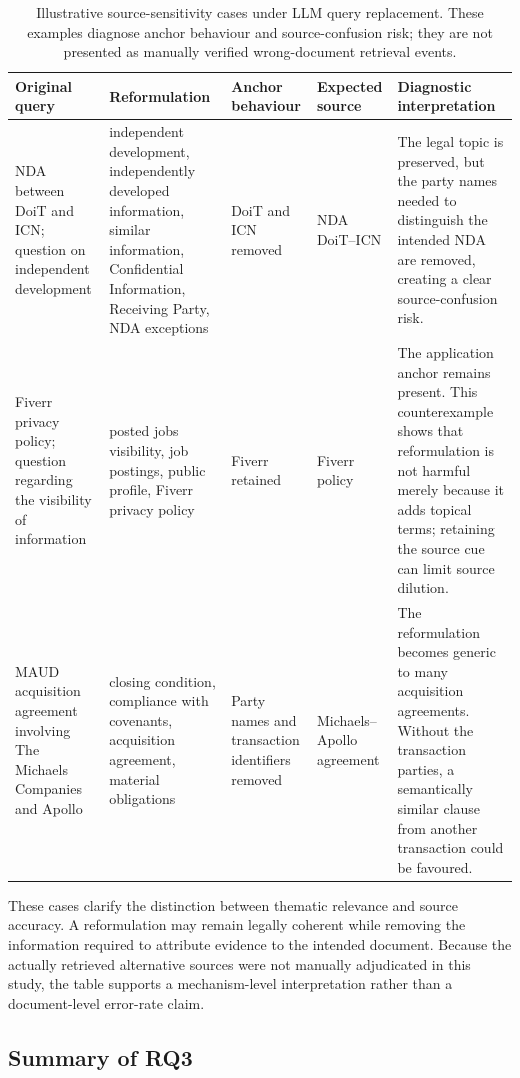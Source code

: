 \documentclass[a4paper,fleqn]{cas-dc}
\begin{document}
\begin{table}[t]
\centering
\caption{Illustrative source-sensitivity cases under LLM query
replacement. These examples diagnose anchor behaviour and source-confusion
risk; they are not presented as manually verified wrong-document
retrieval events.}
\label{tab:wrong-source}
\small
\begin{tabular}{p{3.0cm}p{3.7cm}p{2.5cm}p{2.5cm}p{4.0cm}}
\toprule
\textbf{Original query} &
\textbf{Reformulation} &
\textbf{Anchor behaviour} &
\textbf{Expected source} &
\textbf{Diagnostic interpretation} \\
\midrule
NDA between DoiT and ICN; question on independent development
&
independent development, independently developed information,
similar information, Confidential Information, Receiving Party,
NDA exceptions
&
DoiT and ICN removed
&
NDA DoiT--ICN
&
The legal topic is preserved, but the party names needed to
distinguish the intended NDA are removed, creating a clear
source-confusion risk. \\
\midrule
Fiverr privacy policy; question regarding the visibility of information
&
posted jobs visibility, job postings, public profile,
Fiverr privacy policy
&
Fiverr retained
&
Fiverr policy
&
The application anchor remains present. This counterexample shows
that reformulation is not harmful merely because it adds topical terms;
retaining the source cue can limit source dilution. \\
\midrule
MAUD acquisition agreement involving The Michaels Companies and Apollo
&
closing condition, compliance with covenants, acquisition agreement,
material obligations
&
Party names and transaction identifiers removed
&
Michaels--Apollo agreement
&
The reformulation becomes generic to many acquisition agreements.
Without the transaction parties, a semantically similar clause from
another transaction could be favoured. \\
\bottomrule
\end{tabular}
\end{table}

These cases clarify the distinction between thematic relevance and
source accuracy. A reformulation may remain legally coherent while
removing the information required to attribute evidence to the intended
document. Because the actually retrieved alternative sources were not
manually adjudicated in this study, the table supports a mechanism-level
interpretation rather than a document-level error-rate claim.

\subsection{Summary of RQ3}
\end{document}
